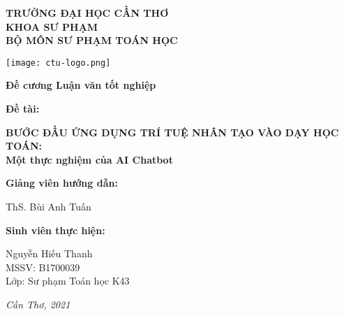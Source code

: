 \thispagestyle{empty}
\begin{center}\large
	\textbf{TRƯỜNG ĐẠI HỌC CẦN THƠ}\\
	\textbf{KHOA SƯ PHẠM}\\
	\textbf{BỘ MÔN SƯ PHẠM TOÁN HỌC}
\end{center}
\vfill
{\centering\texttt{[image: ctu-logo.png]}\par}
\vfill
{\centering\LARGE\textbf{Đề cương Luận văn tốt nghiệp}\par}
\vfill
\begin{adjustwidth}{-1cm}{-1cm}
\begin{center}\huge
	\textbf{Đề tài:}\par
	\textbf{BƯỚC ĐẦU ỨNG DỤNG TRÍ TUỆ NHÂN TẠO VÀO DẠY HỌC TOÁN:}\\
	\textbf{Một thực nghiệm của AI Chatbot}
\end{center}
\end{adjustwidth}
\vfill
\begin{adjustwidth}{1cm}{-1cm}
\begin{multicols}{2}\large
	\textbf{Giảng viên hướng dẫn:}\par
	ThS. Bùi Anh Tuấn\par
	\columnbreak
	\textbf{Sinh viên thực hiện:}\par
	Nguyễn Hiếu Thanh\\
	MSSV: B1700039\\
	Lớp: Sư phạm Toán học K43
\end{multicols}
\end{adjustwidth}
\vfill
{\centering\large\textit{Cần Thơ, 2021}\par}
\newpage
\thispagestyle{empty}
\mbox{}